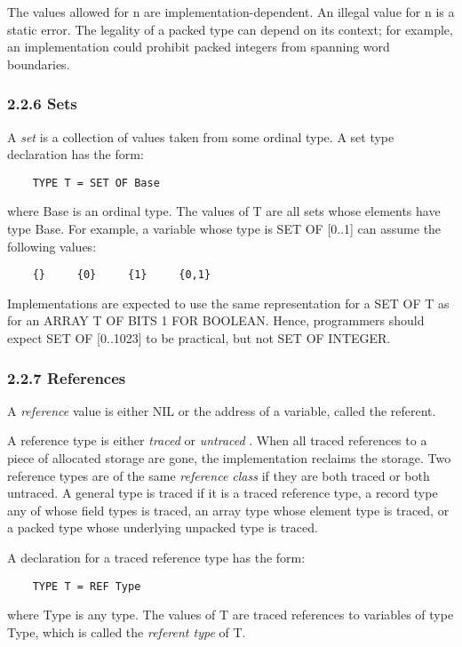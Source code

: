 \documentclass[10pt]{article}
\begin{document}
The values allowed for n are implementation-dependent.  An illegal value for n
is a static error.  The legality of a packed type can depend on its context;
for example, an implementation could prohibit packed integers from spanning
word boundaries.

\subsubsection*{2.2.6 Sets}

A \emph{set} is a collection of values taken from some ordinal type.  A set
type declaration has the form:
\begin{verbatim}
    TYPE T = SET OF Base
\end{verbatim}
where Base is an ordinal type.  The values of T are all sets whose elements
have type Base.  For example, a variable whose type is SET OF [0..1] can assume
the following values:
\begin{verbatim}
    {}     {0}     {1}     {0,1}
\end{verbatim}

Implementations are expected to use the same representation for a SET OF T as
for an ARRAY T OF BITS 1 FOR BOOLEAN.  Hence, programmers should expect SET OF
[0..1023] to be practical, but not SET OF INTEGER.

\subsubsection*{2.2.7 References}

A \emph{reference} value is either NIL or the address of a variable, called
the referent.

A reference type is either \emph{traced} or \emph{untraced} .  When all traced
references to a piece of allocated storage are gone, the implementation
reclaims the storage.  Two reference types are of the same \emph{reference
  class} if they are both traced or both untraced.  A general type is traced if
it is a traced reference type, a record type any of whose field types is
traced, an array type whose element type is traced, or a packed type whose
underlying unpacked type is traced.

A declaration for a traced reference type has the form:
\begin{verbatim}
    TYPE T = REF Type
\end{verbatim}
where Type is any type.  The values of T are traced references to variables of
type Type, which is called the \emph{referent type} of T.
\end{document}
